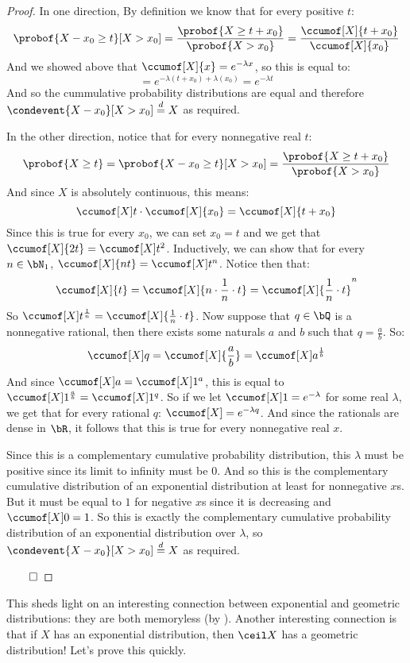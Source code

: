 \begin{proof}

	In one direction, By definition we know that for every positive $t$:
	\[ \probof{X-x_0\geq t}[X>x_0] = \frac{\probof{X\geq t+x_0}}{\probof{X>x_0}} = \frac{\ccumof[X]{t+x_0}}{\ccumof[X]{x_0}} \]
	And we showed above that $\ccumof[X]{x}=e^{-\lambda x}$, so this is equal to:
	\[ = e^{-\lambda(t+x_0)+\lambda(x_0)} = e^{-\lambda t} \]
	And so the cummulative probability distributions are equal and therefore $\condevent{X-x_0}[X>x_0]\deq X$ as required.

	In the other direction, notice that for every nonnegative real $t$:
	\[ \probof{X\geq t} = \probof{X-x_0\geq t}[X>x_0] = \frac{\probof{X\geq t+x_0}}{\probof{X>x_0}} \]
	And since $X$ is absolutely continuous, this means:
	\[ \ccumof[X]t\cdot\ccumof[X]{x_0} = \ccumof[X]{t+x_0} \]
	Since this is true for every $x_0$, we can set $x_0=t$ and we get that $\ccumof[X]{2t}=\ccumof[X]t^2$.
	Inductively, we can show that for every $n\in\bN_1$, $\ccumof[X]{nt}=\ccumof[X]t^n$.
	Notice then that:
	\[ \ccumof[X]{t} = \ccumof[X]{n\cdot\frac1n\cdot t} = \ccumof[X]{\frac1n\cdot t}^n \]
	So $\ccumof[X]t^{\frac1n}=\ccumof[X]{\frac1n\cdot t}$.
	Now suppose that $q\in\bQ$ is a nonnegative rational, then there exists some naturals $a$ and $b$ such that $q=\frac ab$.
	So:
	\[ \ccumof[X]q = \ccumof[X]{\frac ab}=\ccumof[X]a^{\frac1b} \]
	And since $\ccumof[X]a=\ccumof[X]1^a$, this is equal to $\ccumof[X]1^{\frac ab}=\ccumof[X]1^q$.
	So if we let $\ccumof[X]1=e^{-\lambda}$ for some real $\lambda$, we get that for every rational $q$: $\ccumof[X]=e^{-\lambda q}$.
	And since the rationals are dense in $\bR$, it follows that this is true for every nonnegative real $x$.

	Since this is a complementary cumulative probability distribution, this $\lambda$ must be positive since its limit to infinity must be $0$.
	And so this is the complementary cumulative distribution of an exponential distribution at least for nonnegative $x$s.
	But it must be equal to $1$ for negative $x$s since it is decreasing and $\ccumof[X]0=1$.
	So this is exactly the complementary cumulative probability distribution of an exponential distribution over $\lambda$, so
	$\condevent{X-x_0}[X>x_0]\deq X$ as required.

	\hfill$\qed$

\end{proof}

This sheds light on an interesting connection between exponential and geometric distributions: they are both memoryless (by ).
Another interesting connection is that if $X$ has an exponential distribution, then $\ceil X$ has a geometric distribution!
Let's prove this quickly.

